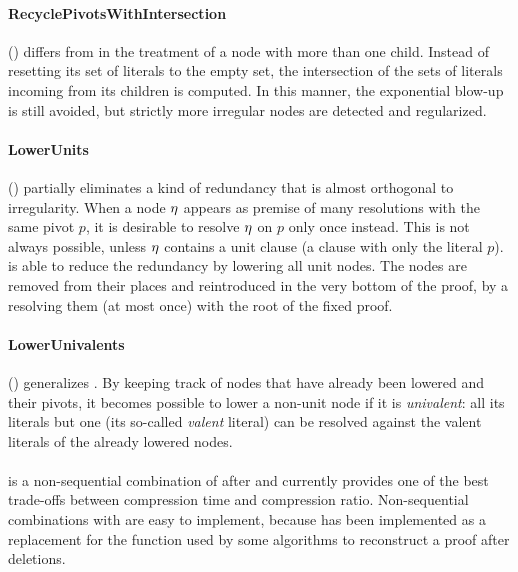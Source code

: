 \documentclass{llncs}
\begin{document}
\paragraph{RecyclePivotsWithIntersection} () \cite{LURPI}
differs from  in the treatment of a node with more than one child. Instead of resetting its set of literals to the empty set, the intersection of the sets of literals incoming from its children is computed. In this manner, the exponential blow-up is still avoided, but strictly more irregular nodes are detected and regularized.


\paragraph{LowerUnits} () \cite{LURPI} partially eliminates a kind of redundancy that is almost orthogonal to irregularity. When a node $\eta$ appears as premise of many resolutions
with the same pivot $p$, it is desirable to resolve $\eta$ on $p$ only once instead. This is not always possible, unless $\eta$ contains a unit clause (a clause with only the literal $p$).
 is able to reduce the redundancy by lowering all unit nodes. The nodes are removed from their places and reintroduced in the very bottom of the proof, by a resolving them (at most once) with the root of the fixed proof. 


\paragraph{LowerUnivalents} () \cite{LUniv} generalizes . By
keeping track of nodes that have already been lowered and their pivots, it becomes
possible to lower a non-unit node if it is \emph{univalent}: all its literals but one (its so-called \emph{valent} literal) can be resolved against the valent literals of the already lowered nodes. 


\paragraph{} \cite{LUniv} is a non-sequential combination of  after  and currently provides one of the best trade-offs between compression time and compression ratio. Non-sequential combinations with  are easy to implement, because  has been implemented as a replacement for the  function used by some algorithms to reconstruct a proof after deletions. 
%
\end{document}
